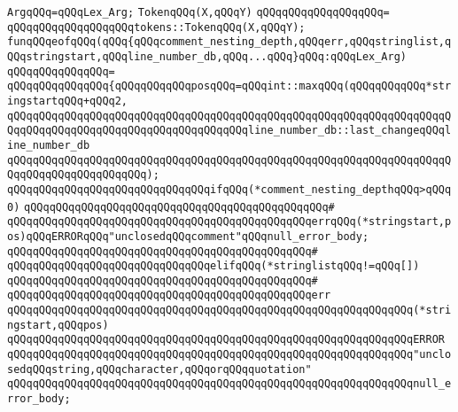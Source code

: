 \newline
\verb|ArgqQQq=qQQqLex_Arg;|\newline
\newline
\verb|TokenqQQq(X,qQQqY)|\newline
\verb|qQQqqQQqqQQqqQQqqQQq=|\newline
\verb|qQQqqQQqqQQqqQQqqQQqtokens::TokenqQQq(X,qQQqY);|\newline
\newline
\verb|funqQQqeofqQQq(qQQq{qQQqcomment_nesting_depth,qQQqerr,qQQqstringlist,qQQqstringstart,qQQqline_number_db,qQQq...qQQq}qQQq:qQQqLex_Arg)|\newline
\verb|qQQqqQQqqQQqqQQq=|\newline
\verb|qQQqqQQqqQQqqQQq{qQQqqQQqqQQqposqQQq=qQQqint::maxqQQq(qQQqqQQqqQQq*stringstartqQQq+qQQq2,|\newline
\verb|qQQqqQQqqQQqqQQqqQQqqQQqqQQqqQQqqQQqqQQqqQQqqQQqqQQqqQQqqQQqqQQqqQQqqQQqqQQqqQQqqQQqqQQqqQQqqQQqqQQqqQQqqQQqline_number_db::last_changeqQQqline_number_db|\newline
\verb|qQQqqQQqqQQqqQQqqQQqqQQqqQQqqQQqqQQqqQQqqQQqqQQqqQQqqQQqqQQqqQQqqQQqqQQqqQQqqQQqqQQqqQQqqQQq);|\newline
\newline
\verb|qQQqqQQqqQQqqQQqqQQqqQQqqQQqqQQqifqQQq(*comment_nesting_depthqQQq>qQQq0)|\newline
\verb|qQQqqQQqqQQqqQQqqQQqqQQqqQQqqQQqqQQqqQQqqQQqqQQq#|\newline
\verb|qQQqqQQqqQQqqQQqqQQqqQQqqQQqqQQqqQQqqQQqqQQqqQQqerrqQQq(*stringstart,pos)qQQqERRORqQQq"unclosedqQQqcomment"qQQqnull_error_body;|\newline
\verb|qQQqqQQqqQQqqQQqqQQqqQQqqQQqqQQqqQQqqQQqqQQqqQQq#|\newline
\verb|qQQqqQQqqQQqqQQqqQQqqQQqqQQqqQQqelifqQQq(*stringlistqQQq!=qQQq[])|\newline
\verb|qQQqqQQqqQQqqQQqqQQqqQQqqQQqqQQqqQQqqQQqqQQqqQQq#|\newline
\verb|qQQqqQQqqQQqqQQqqQQqqQQqqQQqqQQqqQQqqQQqqQQqqQQqerr|\newline
\verb|qQQqqQQqqQQqqQQqqQQqqQQqqQQqqQQqqQQqqQQqqQQqqQQqqQQqqQQqqQQqqQQq(*stringstart,qQQqpos)|\newline
\verb|qQQqqQQqqQQqqQQqqQQqqQQqqQQqqQQqqQQqqQQqqQQqqQQqqQQqqQQqqQQqqQQqERROR|\newline
\verb|qQQqqQQqqQQqqQQqqQQqqQQqqQQqqQQqqQQqqQQqqQQqqQQqqQQqqQQqqQQqqQQq"unclosedqQQqstring,qQQqcharacter,qQQqorqQQqquotation"|\newline
\verb|qQQqqQQqqQQqqQQqqQQqqQQqqQQqqQQqqQQqqQQqqQQqqQQqqQQqqQQqqQQqqQQqnull_error_body;|\newline
